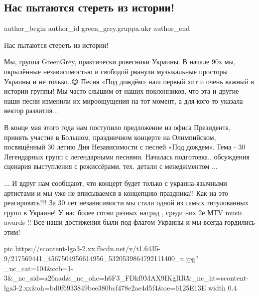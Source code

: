  
 
 
 
 
 
\subsection{Нас пытаются стереть из истории!}
\label{sec:27_07_2021.fb.green_grey.gruppa.ukr.1.grin_grey_ofis_prezidenta_jazyk_mova}
 
\ifcmt
 author_begin
   author_id green_grey.gruppa.ukr
 author_end
\fi

Нас пытаются стереть из истории!


Мы, группа GreenGrey, практически ровесники Украины. В начале 90х мы,
окрылённые независимостью и свободой рванули музыкальные просторы Украины и не
только..😉 Песня «Под дождём» наш первый хит и очень важный в истории группы!
Мы часто слышим от наших поклонников, что эта и другие наши песни изменили их
мироощущения на тот момент, а для кого-то указала вектор развития...

В конце мая этого года нам поступило предложение из офиса Президента, принять
участие в Большом, праздничном концерте на Олимпийском, посвящённый 30 летию
Дня Независимости с песней «Под дождем». Тема - 30 Легендарных групп с
легендарными песнями. Началась подготовка.. обсуждения сценария выступления с
режиссёрами, тех. детали с менеджментом ...

... И вдруг нам сообщают, что концерт будет только с украина-язычными
артистами и мы уже не вписываемся в концепцию праздника!! Как на это
реагировать?!! За 30 лет независимости мы стали одной из самых титулованных
групп в Украине! У нас более сотни разных наград , среди них 2е МТV music
awards !! Все наши достижения были под флагом Украины и мы всегда гордились
этим!

\ifcmt
  pic https://scontent-lga3-2.xx.fbcdn.net/v/t1.6435-9/217569441_4567504956614956_5320539864792111400_n.jpg?_nc_cat=104&ccb=1-3&_nc_sid=a26aad&_nc_ohc=h6F3_FDkf9MAX9IKgRR&_nc_ht=scontent-lga3-2.xx&oh=bd0f6933849bee380bcf478e2ae4d5f4&oe=6125E13E
  width 0.4
\fi

